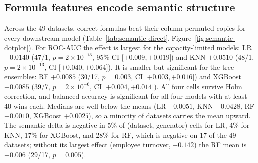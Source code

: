 \subsection{Formula features encode semantic structure}\label{sec:semantic}

Across the 49 datasets, correct formulas beat their column-permuted copies for every downstream model (Table~\ref{tab:semantic-direct}, Figure~\ref{fig:semantic-dotplot}). For ROC-AUC the effect is largest for the capacity-limited models: LR \(+0.0140\) (47/1, \(p = 2 \times 10^{-13}\), 95\% CI \(\lbrack +0.009, +0.019\rbrack\)) and KNN \(+0.0510\) (48/1, \(p = 2 \times 10^{-13}\), CI \(\lbrack +0.040, +0.064\rbrack\)). It is smaller but significant for the tree ensembles: RF \(+0.0085\) (30/17, \(p = 0.003\), CI \(\lbrack +0.003, +0.016\rbrack\)) and XGBoost \(+0.0085\) (39/7, \(p = 2 \times 10^{-6}\), CI \(\lbrack +0.004, +0.014\rbrack\)). All four cells survive Holm correction, and balanced accuracy is significant for all four models with at least 40 wins each. Medians are well below the means (LR \(+0.0051\), KNN \(+0.0428\), RF \(+0.0010\), XGBoost \(+0.0025\)), so a minority of datasets carries the mean upward. The semantic delta is negative in 5\% of (dataset, generator) cells for LR, 4\% for KNN, 17\% for XGBoost, and 28\% for RF, which is negative on 17 of the 49 datasets; without its largest effect (employee turnover, \(+0.142\)) the RF mean is \(+0.006\) (29/17, \(p = 0.005\)).


